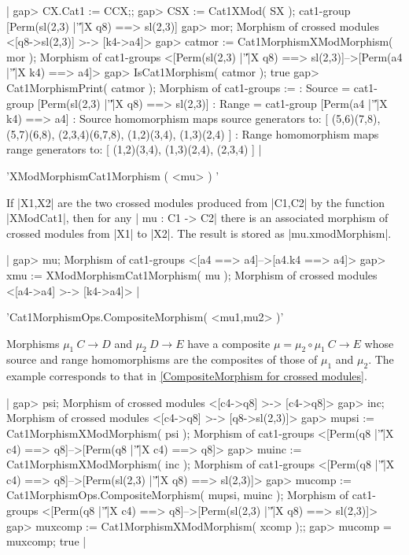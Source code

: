 |    gap> CX.Cat1 := CCX;;
    gap> CSX := Cat1XMod( SX );
    cat1-group [Perm(sl(2,3) |'\|'|X q8) ==> sl(2,3)]
    gap> mor;
    Morphism of crossed modules <[q8->sl(2,3)] >-> [k4->a4]>
    gap> catmor := Cat1MorphismXModMorphism( mor );
    Morphism of cat1-groups
       <[Perm(sl(2,3) |'\|'|X q8) ==> sl(2,3)]-->[Perm(a4 |'\|'|X k4) ==> a4]>
    gap> IsCat1Morphism( catmor );
    true
    gap> Cat1MorphismPrint( catmor );
    Morphism of cat1-groups := 
    : Source = cat1-group [Perm(sl(2,3) |'\|'|X q8) ==> sl(2,3)] 
    :  Range = cat1-group [Perm(a4 |'\|'|X k4) ==> a4] 
    : Source homomorphism maps source generators to:
      [ (5,6)(7,8), (5,7)(6,8), (2,3,4)(6,7,8), (1,2)(3,4), (1,3)(2,4) ]
    : Range homomorphism maps range generators to:
      [ (1,2)(3,4), (1,3)(2,4), (2,3,4) ]           |

%

'XModMorphismCat1Morphism ( <mu> ) '

If  |X1,X2| are the two crossed  modules produced from  |C1,C2| by the
function |XModCat1|, then  for   any | mu  :  C1  -> C2| there  is  an
associated morphism of crossed modules  from |X1| to |X2|.  The result
is stored as |mu.xmodMorphism|.

|    gap> mu;
    Morphism of cat1-groups <[a4 ==> a4]-->[a4.k4 ==> a4]>
    gap> xmu := XModMorphismCat1Morphism( mu );
    Morphism of crossed modules <[a4->a4] >-> [k4->a4]>   |

%

'Cat1MorphismOps.CompositeMorphism( <mu1,mu2> )'

Morphisms $\mu_1 \: C \to D$  and $\mu_2 \:  D \to E$ have a composite
$\mu =   \mu_2  \circ \mu_1   \:   C \to E$  whose   source  and range
homomorphisms are the composites of those of $\mu_1$ and $\mu_2$.  The
example corresponds to that in
\ref{CompositeMorphism for crossed modules}.

|    gap> psi;
    Morphism of crossed modules <[c4->q8] >-> [c4->q8]>
    gap> inc;
    Morphism of crossed modules <[c4->q8] >-> [q8->sl(2,3)]>
    gap> mupsi := Cat1MorphismXModMorphism( psi );
    Morphism of cat1-groups
        <[Perm(q8 |'\|'|X c4) ==> q8]-->[Perm(q8 |'\|'|X c4) ==> q8]>
    gap> muinc := Cat1MorphismXModMorphism( inc );
    Morphism of cat1-groups
        <[Perm(q8 |'\|'|X c4) ==> q8]-->[Perm(sl(2,3) |'\|'|X q8) ==> sl(2,3)]>
    gap> mucomp := Cat1MorphismOps.CompositeMorphism( mupsi, muinc );
    Morphism of cat1-groups
        <[Perm(q8 |'\|'|X c4) ==> q8]-->[Perm(sl(2,3) |'\|'|X q8) ==> sl(2,3)]>
    gap> muxcomp := Cat1MorphismXModMorphism( xcomp );;
    gap> mucomp = muxcomp;
    true   |

